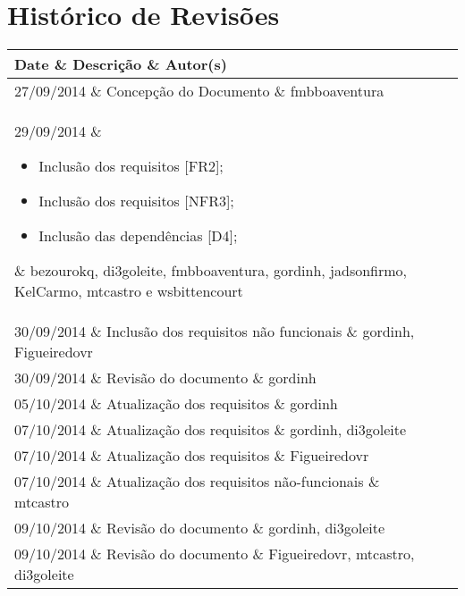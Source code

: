 \documentclass{article}
\begin{document}

\capa
\newpage

\section*{\center Histórico de Revisões}
  \vspace*{1cm}
  \begin{table}[ht]
    \centering
    \begin{tabular}[pos]{|m{2cm} | m{7.2cm} | m{3.8cm}|}
      \hline
      \cellcolor[gray]{0.9}
      \textbf{Date} \& \cellcolor[gray]{0.9}\textbf{Descrição} \& \cellcolor[gray]{0.9}\textbf{Autor(s)}\\ \hline
      \hline
      \small 27/09/2014 \& \small Concepção do Documento \& \small fmbboaventura \\ \hline
      \small 29/09/2014 \&
      \begin{small}
        \begin{itemize}
          \item Inclusão dos requisitos [FR2];
          \item Inclusão dos requisitos [NFR3];
          \item Inclusão das dependências [D4];
        \end{itemize}
      \end{small} \& \small bezourokq, di3goleite, fmbboaventura, gordinh, jadsonfirmo, KelCarmo, mtcastro e wsbittencourt \\ \hline
      \small 30/09/2014 \& \small Inclusão dos requisitos não funcionais \& \small gordinh, Figueiredovr \\ \hline
      \small 30/09/2014 \& \small Revisão do documento \& \small gordinh \\ \hline
      \small 05/10/2014 \& \small Atualização dos requisitos \& \small gordinh \\ \hline
      \small 07/10/2014 \& \small Atualização dos requisitos \& \small gordinh, di3goleite \\ \hline
      \small 07/10/2014 \& \small Atualização dos requisitos \& \small Figueiredovr \\ \hline
      \small 07/10/2014 \& \small Atualização dos requisitos não-funcionais \& \small mtcastro \\ \hline
      \small 09/10/2014 \& \small Revisão do documento \& \small gordinh, di3goleite \\ \hline
      \small 09/10/2014 \& \small Revisão do documento \& \small Figueiredovr, mtcastro, di3goleite \\ \hline
    \end{tabular}
  \end{table}
\end{document}
